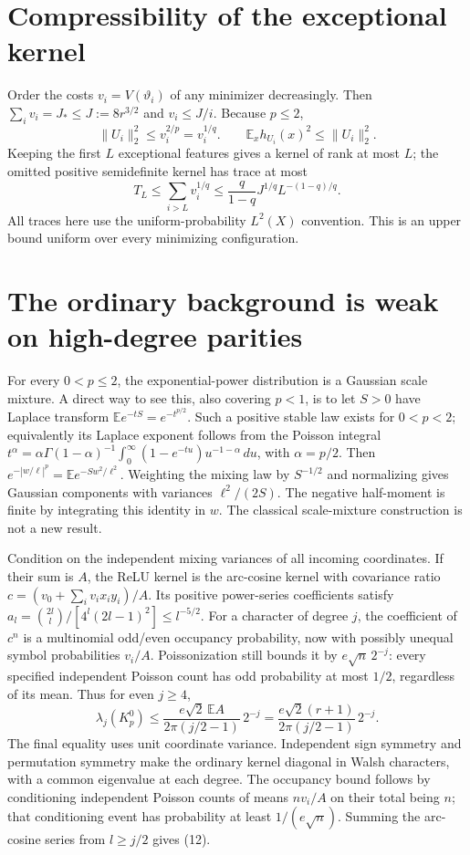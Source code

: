 \documentclass[11pt]{article}
\newcommand{\E}{\mathbb E}\newcommand{\R}{\mathbb R}
\begin{document}
\section{Compressibility of the exceptional kernel}
Order the costs $v_i=V(\vartheta_i)$ of any minimizer decreasingly.
Then $\sum_i v_i=J_*\le J:=8r^{3/2}$ and $v_i\le J/i$.
Because $p\le2$,
\[
 \|U_i\|_2^2\le v_i^{2/p}=v_i^{1/q}.
 \qquad
 \E_x h_{U_i}(x)^2\le\|U_i\|_2^2.
\]
Keeping the first $L$ exceptional features gives a kernel of rank at
most $L$; the omitted positive semidefinite kernel has trace at most
\[
 T_L\le\sum_{i>L}v_i^{1/q}
       \le\frac{q}{1-q}J^{1/q}L^{-(1-q)/q}.             \tag{11}
\]
All traces here use the uniform-probability $L^2(X)$ convention.
This is an upper bound uniform over every minimizing configuration.

\section{The ordinary background is weak on high-degree parities}
For every $0<p\le2$, the exponential-power distribution is a Gaussian
scale mixture. A direct way to see this, also covering $p<1$, is to
let $S>0$ have Laplace transform $\E e^{-tS}=e^{-t^{p/2}}$.
Such a positive stable law exists for $0<p<2$; equivalently its
Laplace exponent follows from the Poisson integral
$t^\alpha=\alpha\Gamma(1-\alpha)^{-1}
\int_0^\infty(1-e^{-tu})u^{-1-\alpha}\,du$,
with $\alpha=p/2$. Then
$e^{-|w/\ell|^p}=\E e^{-Sw^2/\ell^2}$.
Weighting the mixing law by $S^{-1/2}$ and normalizing gives Gaussian
components with variances $\ell^2/(2S)$.
The negative half-moment is finite by integrating this identity in $w$.
The classical scale-mixture construction is not a new result.

Condition on the independent mixing variances of all incoming
coordinates. If their sum is $A$, the ReLU kernel is the arc-cosine
kernel with covariance ratio
$c=(v_0+\sum_i v_i x_i y_i)/A$.
Its positive power-series coefficients satisfy
$a_l=\binom{2l}{l}/[4^l(2l-1)^2]\le l^{-5/2}$.
For a character of degree $j$, the coefficient of $c^n$ is a
multinomial odd/even occupancy probability, now with possibly unequal
symbol probabilities $v_i/A$. Poissonization still bounds it by
$e\sqrt n\,2^{-j}$: every specified independent Poisson count has odd
probability at most $1/2$, regardless of its mean.
Thus for even $j\ge4$,
\[
 \lambda_j(K_p^0)\le
 \frac{e\sqrt2\,\E A}{2\pi(j/2-1)}\,2^{-j}
 =\frac{e\sqrt2(r+1)}{2\pi(j/2-1)}\,2^{-j}.             \tag{12}
\]
The final equality uses unit coordinate variance. Independent sign
symmetry and permutation symmetry make the ordinary kernel diagonal
in Walsh characters, with a common eigenvalue at each degree.
The occupancy bound follows by conditioning independent Poisson counts
of means $nv_i/A$ on their total being $n$; that conditioning event
has probability at least $1/(e\sqrt n)$. Summing the arc-cosine series
from $l\ge j/2$ gives (12).
\end{document}
